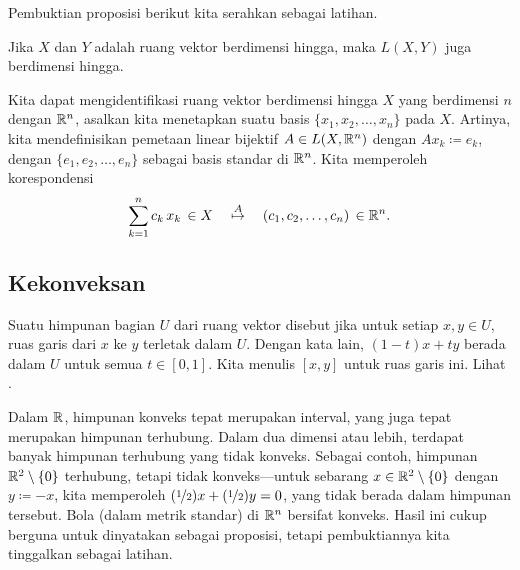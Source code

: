 Pembuktian proposisi berikut kita serahkan sebagai latihan.

\begin{prop} \label{prop:LXYfinitedim}
Jika $X$ dan $Y$ adalah ruang vektor berdimensi hingga, maka $L(X,Y)$
juga berdimensi hingga.
\end{prop}

Kita dapat mengidentifikasi ruang vektor berdimensi hingga
$X$ yang berdimensi $n$ dengan ${\mathbb{R}}^n$, asalkan kita menetapkan suatu basis
$\{ x_1, x_2, \ldots, x_n \}$ pada $X$.  Artinya, kita mendefinisikan pemetaan linear
bijektif $A \in L(X,{\mathbb{R}}^n)$ dengan
$Ax_k \coloneqq e_k$, dengan $\{ e_1, e_2, \ldots, e_n \}$ sebagai basis standar
di ${\mathbb{R}}^n$.  Kita memperoleh
korespondensi
\begin{equation*}
\sum_{k=1}^n c_k \, x_k \, \in X
\quad
\overset{A}{\mapsto}
\quad
(c_1,c_2,\ldots,c_n) \, \in {\mathbb{R}}^n .
\end{equation*}

\subsection{Kekonveksan}

Suatu himpunan bagian $U$ dari ruang vektor disebut \emph{}
jika untuk setiap $x,y \in U$, ruas garis dari
$x$ ke $y$ terletak dalam $U$.  Dengan kata lain, \emph{}
$(1-t)x+ty$ berada dalam $U$ untuk semua $t \in [0,1]$.
Kita menulis $[x,y]$ untuk ruas garis ini.
Lihat .

\begin{myfigureht}
\caption{Kekonveksan.\label{mv:convexcomb}}
\end{myfigureht}

Dalam ${\mathbb{R}}$, himpunan konveks tepat merupakan interval, yang juga
tepat merupakan himpunan terhubung.
Dalam dua dimensi atau lebih,
terdapat banyak himpunan terhubung yang tidak konveks.  Sebagai contoh,
himpunan ${\mathbb{R}}^2 \setminus \{0\}$ terhubung,
tetapi tidak konveks---untuk sebarang $x \in {\mathbb{R}}^2 \setminus \{0\}$ dengan $y \coloneqq -x$,
kita memperoleh
$(\nicefrac{1}{2})x + (\nicefrac{1}{2})y = 0$, yang tidak berada dalam himpunan tersebut.
Bola (dalam metrik standar) di ${\mathbb{R}}^n$ bersifat konveks.  Hasil ini
cukup berguna untuk dinyatakan sebagai proposisi,
tetapi pembuktiannya kita tinggalkan sebagai latihan.

